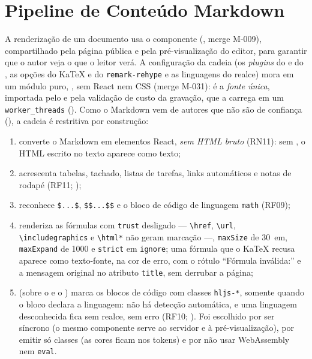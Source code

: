 
\section{Pipeline de Conteúdo Markdown}\label{sec:arq-markdown}

A renderização de um documento usa o componente  (, merge M-009), compartilhado pela página pública e pela pré-visualização do editor, para garantir que o autor veja o que o leitor verá. A configuração da cadeia (os \emph{plugins} do  e do , as opções do KaTeX e do \texttt{remark-rehype} e as linguagens do realce) mora em um módulo puro, , sem React nem CSS (merge M-031): é a \emph{fonte única}, importada pelo  e pela validação de custo da gravação, que a carrega em um \texttt{worker\_threads} (). Como o Markdown vem de autores que não são de confiança (), a cadeia é restritiva por construção:

\begin{enumerate}
  \item {} converte o Markdown em elementos React, \emph{sem HTML bruto} (RN11): sem , o HTML escrito no texto aparece como texto;
  \item {} acrescenta tabelas, tachado, listas de tarefas, links automáticos e notas de rodapé (RF11; );
  \item {} reconhece \texttt{\$...\$}, \texttt{\$\$...\$\$} e o bloco de código de linguagem \texttt{math} (RF09);
  \item {} renderiza as fórmulas com \texttt{trust} desligado --- \texttt{\textbackslash href}, \texttt{\textbackslash url}, \texttt{\textbackslash include}\allowbreak\texttt{graphics} e \texttt{\textbackslash html*} não geram marcação ---, \texttt{maxSize} de 30~em, \texttt{maxExpand} de 1000 e \texttt{strict} em \texttt{ignore}; uma fórmula que o KaTeX recusa aparece como texto-fonte, na cor de erro, com o rótulo ``Fórmula inválida:'' e a mensagem original no atributo \texttt{title}, sem derrubar a página;
  \item {} (sobre o  e o ) marca os blocos de código com classes \texttt{hljs-*}, somente quando o bloco declara a linguagem: não há detecção automática, e uma linguagem desconhecida fica sem realce, sem erro (RF10; ). Foi escolhido por ser síncrono (o mesmo componente serve ao servidor e à pré-visualização), por emitir só classes (as cores ficam nos tokens) e por não usar WebAssembly nem \texttt{eval}.
\end{enumerate}

